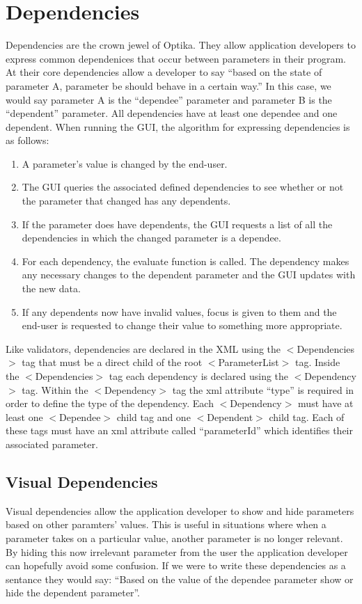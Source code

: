 \section{Dependencies}
Dependencies are the crown jewel of Optika. They allow application developers to express common dependenices that occur between
parameters in their program. At their core dependencies allow a developer to say ``based on the state of parameter A, parameter be should
behave in a certain way.'' In this case, we would say parameter A is the ``dependee'' parameter and parameter B is the ``dependent'' parameter.
All dependencies have at least one dependee and one dependent. When running the GUI, the algorithm for expressing dependencies is as follows:
\begin{enumerate}
	\item A parameter's value is changed by the end-user.
	\item The GUI queries the associated defined dependencies to see whether or not the parameter that changed has any dependents.
	\item If the parameter does have dependents, the GUI requests a list of all the dependencies in which the changed
	parameter is a dependee.
	\item For each dependency, the evaluate function is called. The dependency makes any necessary changes to the dependent parameter
	and the GUI updates with the new data.
	\item If any dependents now have invalid values, focus is given to them and the end-user is requested to change their value to
	something more appropriate.
\end{enumerate}
Like validators, dependencies are declared in the XML using the $<$Dependencies$>$ tag that must be a direct child
of the root $<$ParameterList$>$ tag. Inside the $<$Dependencies$>$ tag each dependency is declared using the $<$Dependency$>$ tag. Within the
$<$Dependency$>$ tag the xml attribute ``type'' is required in order to define the type of the dependency. Each $<$Dependency$>$ must have at least
one $<$Dependee$>$ child tag and one $<$Dependent$>$ child tag. Each of these tags must have an xml attribute called ``parameterId'' which identifies
their associated parameter.

\subsection{Visual Dependencies}
Visual dependencies allow the application developer to show and hide parameters based on other paramters' values. This is useful in situations where
when a parameter takes on a particular value, another parameter is no longer relevant. By hiding this now irrelevant parameter from the user the
application developer can hopefully avoid some confusion. If we were to write these dependencies as a sentance they would say: ``Based on
the value of the dependee parameter show or hide the dependent parameter''.

